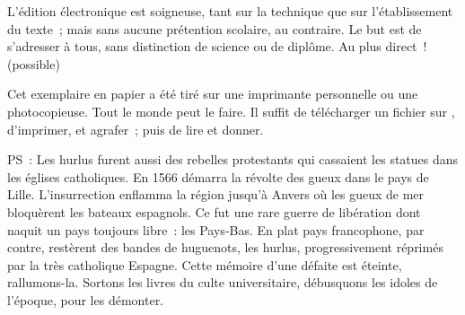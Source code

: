 \documentclass[french,twoside]{book} %
\begin{document}
  L’édition électronique est soigneuse, tant sur la technique
  que sur l’établissement du texte ; mais sans aucune prétention scolaire, au contraire.
  Le but est de s’adresser à tous, sans distinction de science ou de diplôme.
  Au plus direct ! (possible)
  \par

  Cet exemplaire en papier a été tiré sur une imprimante personnelle
   ou une photocopieuse. Tout le monde peut le faire.
  Il suffit de
  télécharger un fichier sur \href{https://hurlus.fr}{},
  d’imprimer, et agrafer ; puis de lire et donner.\par

  \bigskip

  \noindent PS : Les hurlus furent aussi des rebelles protestants qui cassaient les statues dans les églises catholiques. En 1566 démarra la révolte des gueux dans le pays de Lille. L’insurrection enflamma la région jusqu’à Anvers où les gueux de mer bloquèrent les bateaux espagnols.
  Ce fut une rare guerre de libération dont naquit un pays toujours libre : les Pays-Bas.
  En plat pays francophone, par contre, restèrent des bandes de huguenots, les hurlus, progressivement réprimés par la très catholique Espagne.
  Cette mémoire d’une défaite est éteinte, rallumons-la. Sortons les livres du culte universitaire, débusquons les idoles de l’époque, pour les démonter.
\fi
\end{document}
